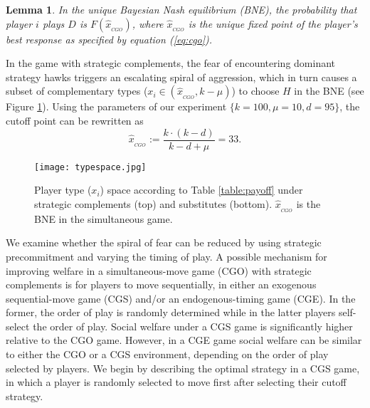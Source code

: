\documentclass[12pt, letterpaper]{article}
\theoremstyle{plain}
\begin{document}
\newtheorem{lem}{Lemma}
\begin{lem}
In the unique Bayesian Nash equilibrium (BNE), the probability that player $i$ plays $D$ is $F(\hat{x}_{_{CGO}})$, where $\hat{x}_{_{CGO}}$ is the unique fixed point of the player's best response as specified by equation (\ref{eq:cgo}).
\end{lem}\par

In the game with strategic complements, the fear of encountering dominant strategy hawks triggers an escalating spiral of aggression, which in turn causes a subset of complementary types ($x_i \in (\hat{x}_{_{CGO}}, k-\mu)$) to choose $H$ in the BNE (see Figure \ref{fig:typespace}). Using the parameters of our experiment $\{k=100, \mu=10, d=95 \}$, the cutoff point can be rewritten as 
\begin{equation}
\hat{x}_{_{CGO}}:= \frac{k\cdot (k-d)}{k-d+\mu}=33. \label{eq:cgosol}
\end{equation}


\begin{center}
\begin{figure}[ht]
\centering{}%
\texttt{[image: typespace.jpg]}%
\caption{Player type ($x_i$) space according to Table \ref{table:payoff} under strategic complements (top) and substitutes (bottom). $\hat{x}_{_{CGO}}$ is the BNE in the simultaneous game.} 
\label{fig:typespace}
\end{figure}
\end{center}

We examine whether the spiral of fear can be reduced by using strategic precommitment and varying the timing of play. A possible mechanism for improving welfare in a simultaneous-move game (CGO) with strategic complements is for players to move sequentially, in either an exogenous sequential-move game (CGS) and/or an endogenous-timing game (CGE). In the former, the order of play is randomly determined while in the latter players self-select the order of play. Social welfare under a CGS game is significantly higher relative to the CGO game. However, in a CGE game social welfare can be similar to either the CGO or a CGS environment, depending on the order of play selected by players. We begin by describing the optimal strategy in a CGS game, in which a player is randomly selected to move first after selecting their cutoff strategy. 
\end{document}
